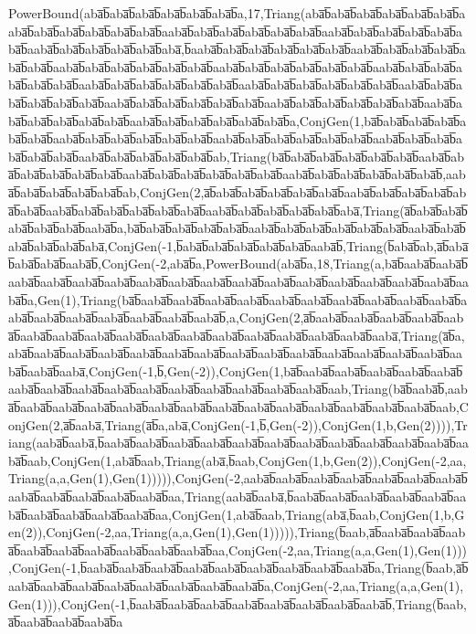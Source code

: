 PowerBound(aba̅b̅aba̅b̅aba̅b̅aba̅b̅aba̅b̅aba̅b̅a,17,Triang(aba̅b̅aba̅b̅aba̅b̅aba̅b̅aba̅b̅aba̅b̅aaba̅b̅aba̅b̅aba̅b̅aba̅b̅aba̅b̅aba̅b̅aaba̅b̅aba̅b̅aba̅b̅aba̅b̅aba̅b̅aba̅b̅aaba̅b̅aba̅b̅aba̅b̅aba̅b̅aba̅b̅aba̅b̅aaba̅b̅aba̅b̅aba̅b̅aba̅b̅aba̅b̅aba̅,b̅aaba̅b̅aba̅b̅aba̅b̅aba̅b̅aba̅b̅aba̅b̅aaba̅b̅aba̅b̅aba̅b̅aba̅b̅aba̅b̅aba̅b̅aaba̅b̅aba̅b̅aba̅b̅aba̅b̅aba̅b̅aba̅b̅aaba̅b̅aba̅b̅aba̅b̅aba̅b̅aba̅b̅aba̅b̅aaba̅b̅aba̅b̅aba̅b̅aba̅b̅aba̅b̅aba̅b̅aaba̅b̅aba̅b̅aba̅b̅aba̅b̅aba̅b̅aba̅b̅aaba̅b̅aba̅b̅aba̅b̅aba̅b̅aba̅b̅aba̅b̅aaba̅b̅aba̅b̅aba̅b̅aba̅b̅aba̅b̅aba̅b̅aaba̅b̅aba̅b̅aba̅b̅aba̅b̅aba̅b̅aba̅b̅aaba̅b̅aba̅b̅aba̅b̅aba̅b̅aba̅b̅aba̅b̅aaba̅b̅aba̅b̅aba̅b̅aba̅b̅aba̅b̅aba̅b̅aaba̅b̅aba̅b̅aba̅b̅aba̅b̅aba̅b̅aba̅b̅a,ConjGen(1,ba̅b̅aba̅b̅aba̅b̅aba̅b̅aba̅b̅aba̅b̅aaba̅b̅aba̅b̅aba̅b̅aba̅b̅aba̅b̅aba̅b̅aaba̅b̅aba̅b̅aba̅b̅aba̅b̅aba̅b̅aba̅b̅aaba̅b̅aba̅b̅aba̅b̅aba̅b̅aba̅b̅aba̅b̅aaba̅b̅aba̅b̅aba̅b̅aba̅b̅aba̅b̅ab,Triang(ba̅b̅aba̅b̅aba̅b̅aba̅b̅aba̅b̅aba̅b̅aaba̅b̅aba̅b̅aba̅b̅aba̅b̅aba̅b̅aba̅b̅aaba̅b̅aba̅b̅aba̅b̅aba̅b̅aba̅b̅aba̅b̅aaba̅b̅aba̅b̅aba̅b̅aba̅b̅aba̅b̅aba̅b̅,aaba̅b̅aba̅b̅aba̅b̅aba̅b̅aba̅b̅ab,ConjGen(2,a̅b̅aba̅b̅aba̅b̅aba̅b̅aba̅b̅aba̅b̅aaba̅b̅aba̅b̅aba̅b̅aba̅b̅aba̅b̅aba̅b̅aaba̅b̅aba̅b̅aba̅b̅aba̅b̅aba̅b̅aba̅b̅aaba̅b̅aba̅b̅aba̅b̅aba̅b̅aba̅b̅aba̅,Triang(a̅b̅aba̅b̅aba̅b̅aba̅b̅aba̅b̅aba̅b̅aaba̅b̅a,ba̅b̅aba̅b̅aba̅b̅aba̅b̅aba̅b̅aaba̅b̅aba̅b̅aba̅b̅aba̅b̅aba̅b̅aba̅b̅aaba̅b̅aba̅b̅aba̅b̅aba̅b̅aba̅b̅aba̅,ConjGen(-1,b̅aba̅b̅aba̅b̅aba̅b̅aba̅b̅aba̅b̅aaba̅b̅,Triang(b̅aba̅b̅ab,a̅b̅aba̅b̅aba̅b̅aba̅b̅aaba̅b̅,ConjGen(-2,aba̅b̅a,PowerBound(aba̅b̅a,18,Triang(a,ba̅b̅aaba̅b̅aaba̅b̅aaba̅b̅aaba̅b̅aaba̅b̅aaba̅b̅aaba̅b̅aaba̅b̅aaba̅b̅aaba̅b̅aaba̅b̅aaba̅b̅aaba̅b̅aaba̅b̅aaba̅b̅aaba̅b̅aaba̅b̅a,Gen(1),Triang(ba̅b̅aaba̅b̅aaba̅b̅aaba̅b̅aaba̅b̅aaba̅b̅aaba̅b̅aaba̅b̅aaba̅b̅aaba̅b̅aaba̅b̅aaba̅b̅aaba̅b̅aaba̅b̅aaba̅b̅aaba̅b̅aaba̅b̅aaba̅b̅,a,ConjGen(2,a̅b̅aaba̅b̅aaba̅b̅aaba̅b̅aaba̅b̅aaba̅b̅aaba̅b̅aaba̅b̅aaba̅b̅aaba̅b̅aaba̅b̅aaba̅b̅aaba̅b̅aaba̅b̅aaba̅b̅aaba̅b̅aaba̅b̅aaba̅,Triang(a̅b̅a,aba̅b̅aaba̅b̅aaba̅b̅aaba̅b̅aaba̅b̅aaba̅b̅aaba̅b̅aaba̅b̅aaba̅b̅aaba̅b̅aaba̅b̅aaba̅b̅aaba̅b̅aaba̅b̅aaba̅b̅aaba̅b̅aaba̅,ConjGen(-1,b̅,Gen(-2)),ConjGen(1,ba̅b̅aaba̅b̅aaba̅b̅aaba̅b̅aaba̅b̅aaba̅b̅aaba̅b̅aaba̅b̅aaba̅b̅aaba̅b̅aaba̅b̅aaba̅b̅aaba̅b̅aaba̅b̅aaba̅b̅aaba̅b̅aab,Triang(ba̅b̅aaba̅b̅,aaba̅b̅aaba̅b̅aaba̅b̅aaba̅b̅aaba̅b̅aaba̅b̅aaba̅b̅aaba̅b̅aaba̅b̅aaba̅b̅aaba̅b̅aaba̅b̅aaba̅b̅aaba̅b̅aab,ConjGen(2,a̅b̅aaba̅,Triang(a̅b̅a,aba̅,ConjGen(-1,b̅,Gen(-2)),ConjGen(1,b,Gen(2)))),Triang(aaba̅b̅aaba̅,b̅aaba̅b̅aaba̅b̅aaba̅b̅aaba̅b̅aaba̅b̅aaba̅b̅aaba̅b̅aaba̅b̅aaba̅b̅aaba̅b̅aaba̅b̅aaba̅b̅aab,ConjGen(1,aba̅b̅aab,Triang(aba̅,b̅aab,ConjGen(1,b,Gen(2)),ConjGen(-2,aa,Triang(a,a,Gen(1),Gen(1))))),ConjGen(-2,aaba̅b̅aaba̅b̅aaba̅b̅aaba̅b̅aaba̅b̅aaba̅b̅aaba̅b̅aaba̅b̅aaba̅b̅aaba̅b̅aaba̅b̅aaba̅b̅aa,Triang(aaba̅b̅aaba̅,b̅aaba̅b̅aaba̅b̅aaba̅b̅aaba̅b̅aaba̅b̅aaba̅b̅aaba̅b̅aaba̅b̅aaba̅b̅aaba̅b̅aa,ConjGen(1,aba̅b̅aab,Triang(aba̅,b̅aab,ConjGen(1,b,Gen(2)),ConjGen(-2,aa,Triang(a,a,Gen(1),Gen(1))))),Triang(b̅aab,a̅b̅aaba̅b̅aaba̅b̅aaba̅b̅aaba̅b̅aaba̅b̅aaba̅b̅aaba̅b̅aaba̅b̅aaba̅b̅aa,ConjGen(-2,aa,Triang(a,a,Gen(1),Gen(1))),ConjGen(-1,b̅aaba̅b̅aaba̅b̅aaba̅b̅aaba̅b̅aaba̅b̅aaba̅b̅aaba̅b̅aaba̅b̅aaba̅b̅a,Triang(b̅aab,a̅b̅aaba̅b̅aaba̅b̅aaba̅b̅aaba̅b̅aaba̅b̅aaba̅b̅aaba̅b̅aaba̅b̅a,ConjGen(-2,aa,Triang(a,a,Gen(1),Gen(1))),ConjGen(-1,b̅aaba̅b̅aaba̅b̅aaba̅b̅aaba̅b̅aaba̅b̅aaba̅b̅aaba̅b̅aaba̅b̅,Triang(b̅aab,a̅b̅aaba̅b̅aaba̅b̅aaba̅b̅a